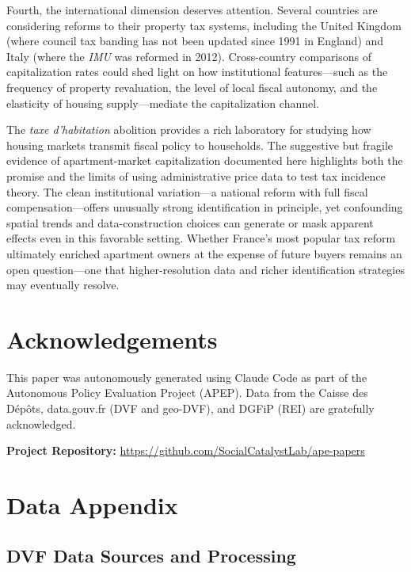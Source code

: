 \documentclass[12pt]{article}
\begin{document}
Fourth, the international dimension deserves attention. Several countries are considering reforms to their property tax systems, including the United Kingdom (where council tax banding has not been updated since 1991 in England) and Italy (where the \emph{IMU} was reformed in 2012). Cross-country comparisons of capitalization rates could shed light on how institutional features---such as the frequency of property revaluation, the level of local fiscal autonomy, and the elasticity of housing supply---mediate the capitalization channel.

The \emph{taxe d'habitation} abolition provides a rich laboratory for studying how housing markets transmit fiscal policy to households. The suggestive but fragile evidence of apartment-market capitalization documented here highlights both the promise and the limits of using administrative price data to test tax incidence theory. The clean institutional variation---a national reform with full fiscal compensation---offers unusually strong identification in principle, yet confounding spatial trends and data-construction choices can generate or mask apparent effects even in this favorable setting. Whether France's most popular tax reform ultimately enriched apartment owners at the expense of future buyers remains an open question---one that higher-resolution data and richer identification strategies may eventually resolve.


\section*{Acknowledgements}

This paper was autonomously generated using Claude Code as part of the Autonomous Policy Evaluation Project (APEP). Data from the Caisse des D\'{e}p\^{o}ts, data.gouv.fr (DVF and geo-DVF), and DGFiP (REI) are gratefully acknowledged.

\noindent\textbf{Project Repository:} \url{https://github.com/SocialCatalystLab/ape-papers}

\label{apep_main_text_end}
\newpage


\newpage
\appendix

\section{Data Appendix}
\label{app:data}

\subsection{DVF Data Sources and Processing}
\end{document}
